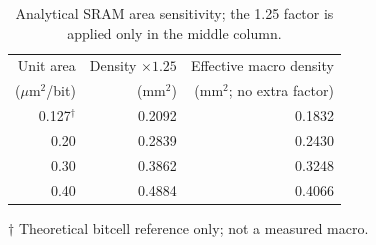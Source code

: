 \begin{table}[t]
\centering\small
\caption{Analytical SRAM area sensitivity; the 1.25 factor is applied only in the middle column.}
\label{tab:palimpsest-area-sensitivity}
\begin{tabular}{rrr}
\toprule
Unit area & Density $\times1.25$ & Effective macro density \\
($\mu$m$^2$/bit) & (mm$^2$) & (mm$^2$; no extra factor) \\
\midrule
0.127$^{\dagger}$ & 0.2092 & 0.1832 \\
0.20 & 0.2839 & 0.2430 \\
0.30 & 0.3862 & 0.3248 \\
0.40 & 0.4884 & 0.4066 \\
\bottomrule
\end{tabular}
\par\footnotesize $\dagger$ Theoretical bitcell reference only; not a measured macro.
\end{table}
